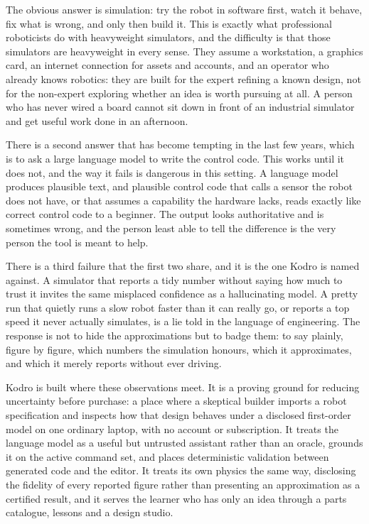 \documentclass[11pt,a4paper]{report}
\begin{document}
 The obvious answer is simulation: try the robot in software first, watch it behave, fix what is wrong, and only then build it. This is exactly what professional roboticists do with heavyweight simulators, and the difficulty is that those simulators are heavyweight in every sense. They assume a workstation, a graphics card, an internet connection for assets and accounts, and an operator who already knows robotics: they are built for the expert refining a known design, not for the non-expert exploring whether an idea is worth pursuing at all. A person who has never wired a board cannot sit down in front of an industrial simulator and get useful work done in an afternoon.

 There is a second answer that has become tempting in the last few years, which is to ask a large language model to write the control code. This works until it does not, and the way it fails is dangerous in this setting. A language model produces plausible text, and plausible control code that calls a sensor the robot does not have, or that assumes a capability the hardware lacks, reads exactly like correct control code to a beginner. The output looks authoritative and is sometimes wrong, and the person least able to tell the difference is the very person the tool is meant to help.

 There is a third failure that the first two share, and it is the one Kodro is named against. A simulator that reports a tidy number without saying how much to trust it invites the same misplaced confidence as a hallucinating model. A pretty run that quietly runs a slow robot faster than it can really go, or reports a top speed it never actually simulates, is a lie told in the language of engineering. The response is not to hide the approximations but to badge them: to say plainly, figure by figure, which numbers the simulation honours, which it approximates, and which it merely reports without ever driving.

 Kodro is built where these observations meet. It is a proving ground for reducing uncertainty before purchase: a place where a skeptical builder imports a robot specification and inspects how that design behaves under a disclosed first-order model on one ordinary laptop, with no account or subscription. It treats the language model as a useful but untrusted assistant rather than an oracle, grounds it on the active command set, and places deterministic validation between generated code and the editor. It treats its own physics the same way, disclosing the fidelity of every reported figure rather than presenting an approximation as a certified result, and it serves the learner who has only an idea through a parts catalogue, lessons and a design studio.
\end{document}
